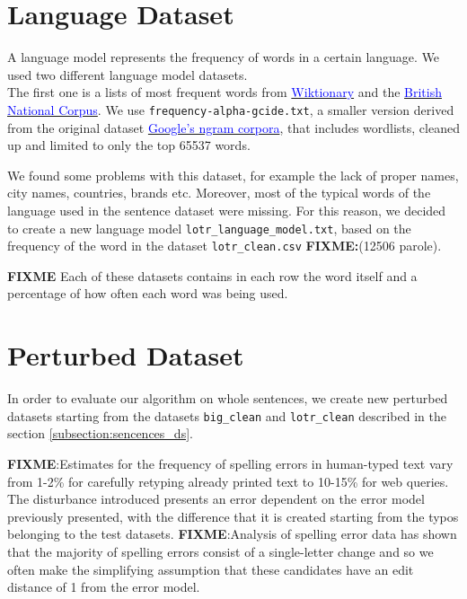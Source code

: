 \section{Language Dataset}
A language model represents the frequency of words in a certain language.
We used two different language model datasets. \\
The first one is a lists of most frequent words from 
\href{https://en.wiktionary.org/wiki/Wiktionary:Frequency_lists}{ 
	\textcolor{blue}{Wiktionary}} and the 
	\href{http://www.kilgarriff.co.uk/bnc-readme.html}{\textcolor{blue}{British National Corpus}}. 
We use \texttt{frequency-alpha-gcide.txt}, a smaller version derived from the original dataset 
\href{https://books.google.com/ngrams/}{\textcolor{blue}{Google's ngram corpora}}, that includes wordlists, 
cleaned up and limited to only the top \num{65537} words.

We found some problems with this dataset, for example the lack of proper names, city names, countries, brands 
etc.
Moreover, most of the typical words of the language used in the sentence dataset were missing.
For this reason, we decided to create a new language model \texttt{lotr\_language\_model.txt}, based on the 
frequency of the word in the dataset \texttt{lotr\_clean.csv} \textbf{FIXME:}(12506 parole).

\textbf{FIXME}{
	Each of these datasets contains in each row the word itself and a percentage of how often each word was 
	being used.}

\section{Perturbed Dataset}
\label{section:perturbed}
In order to evaluate our algorithm on whole sentences, we create new perturbed datasets starting from the 
datasets \texttt{big\_clean} and \texttt{lotr\_clean} described in the section \ref{subsection:sencences_ds}.

\textbf{FIXME}:Estimates for the frequency of spelling errors in human-typed text vary from 1-2\% for carefully 
retyping already printed text to 10-15\% for web queries.
The disturbance introduced presents an error dependent on the error model previously presented, with the 
difference that it is created starting from the typos belonging to the test datasets.
\textbf{FIXME}:{Analysis of spelling error data has shown that the majority of spelling errors consist of a 
single-letter change and so we often make the simplifying assumption that these candidates have an edit 
distance of 1 from the error model.}

